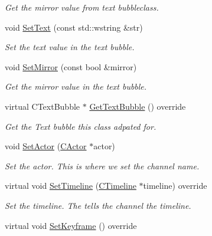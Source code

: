 \begin{DoxyCompactItemize}
\begin{DoxyCompactList}\small\item\em Get the mirror value from text bubbleclass. \end{DoxyCompactList}\item 
void \hyperlink{class_c_text_bubble_drawable_ac7d35d877413dfa7f633646a09e67ffe}{Set\+Text} (const std\+::wstring \&str)
\begin{DoxyCompactList}\small\item\em Set the text value in the text bubble. \end{DoxyCompactList}\item 
void \hyperlink{class_c_text_bubble_drawable_acb036cd5239ba203bb7cf55616a32b88}{Set\+Mirror} (const bool \&mirror)
\begin{DoxyCompactList}\small\item\em Get the mirror value in the text bubble. \end{DoxyCompactList}\item 
\hypertarget{class_c_text_bubble_drawable_a0df72f52a5df614eccdff89bf12cf905}{virtual C\+Text\+Bubble $\ast$ \hyperlink{class_c_text_bubble_drawable_a0df72f52a5df614eccdff89bf12cf905}{Get\+Text\+Bubble} () override}\label{class_c_text_bubble_drawable_a0df72f52a5df614eccdff89bf12cf905}

\begin{DoxyCompactList}\small\item\em Get the Text bubble this class adpated for. \end{DoxyCompactList}\item 
void \hyperlink{class_c_text_bubble_drawable_a6e154d1a283f3f0b85eb1f3d1480c21e}{Set\+Actor} (\hyperlink{class_c_actor}{C\+Actor} $\ast$actor)
\begin{DoxyCompactList}\small\item\em Set the actor. This is where we set the channel name. \end{DoxyCompactList}\item 
virtual void \hyperlink{class_c_text_bubble_drawable_adbf6b04696680906cc3cb32e7a0918b9}{Set\+Timeline} (\hyperlink{class_c_timeline}{C\+Timeline} $\ast$timeline) override
\begin{DoxyCompactList}\small\item\em Set the timeline. The tells the channel the timeline. \end{DoxyCompactList}\item 
\hypertarget{class_c_text_bubble_drawable_a360ce876ba0ccdb24a22bc356597e6d1}{virtual void \hyperlink{class_c_text_bubble_drawable_a360ce876ba0ccdb24a22bc356597e6d1}{Set\+Keyframe} () override}\label{class_c_text_bubble_drawable_a360ce876ba0ccdb24a22bc356597e6d1}


\end{DoxyCompactItemize}
